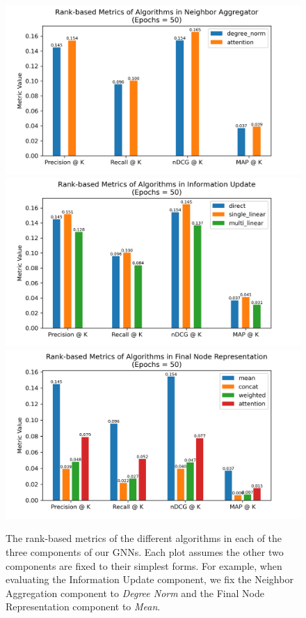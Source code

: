 \documentclass{article}
\begin{document}
\begin{figure}[H]
    \centering
    \includegraphics[width=.49\textwidth]{figs/neighbor_aggregator.png}
    \includegraphics[width=.49\textwidth]{figs/info_updater.png}
    \includegraphics[width=.49\textwidth]{figs/final_node_repr.png}
    \caption{The rank-based metrics of the different algorithms in each of the three components of our GNNs. Each plot assumes the other two components are fixed to their simplest forms. For example, when evaluating the Information Update component, we fix the Neighbor Aggregation component to \textit{Degree Norm} and the Final Node Representation component to \textit{Mean}.}
    \label{fig:metrics-individual-components}
\end{figure}
\end{document}
